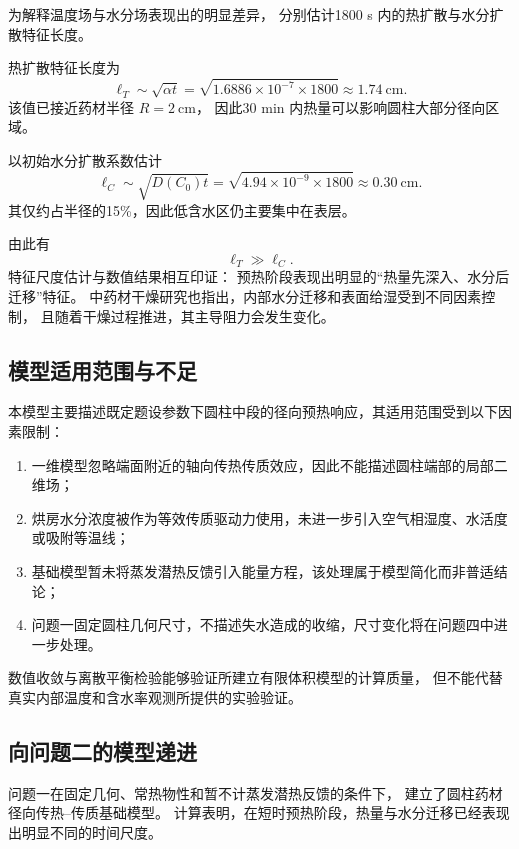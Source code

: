 \documentclass[UTF8,a4paper,12pt]{ctexart}
\begin{document}
为解释温度场与水分场表现出的明显差异，
分别估计1800 s 内的热扩散与水分扩散特征长度。

热扩散特征长度为
\begin{equation}
\ell_T\sim\sqrt{\alpha t}
=
\sqrt{
1.6886\times10^{-7}\times1800
}
\approx1.74\ \mathrm{cm}.
\end{equation}
该值已接近药材半径 $R=2~\mathrm{cm}$，
因此30 min 内热量可以影响圆柱大部分径向区域。

以初始水分扩散系数估计
\begin{equation}
\ell_C
\sim
\sqrt{D(C_0)t}
=
\sqrt{
4.94\times10^{-9}\times1800
}
\approx0.30\ \mathrm{cm}.
\end{equation}
其仅约占半径的15\%，因此低含水区仍主要集中在表层。

由此有
\begin{equation}
\ell_T\gg\ell_C.
\end{equation}
特征尺度估计与数值结果相互印证：
预热阶段表现出明显的“热量先深入、水分后迁移”特征。
中药材干燥研究也指出，内部水分迁移和表面给湿受到不同因素控制，
且随着干燥过程推进，其主导阻力会发生变化\cite{wang2024}。

\subsection{模型适用范围与不足}

本模型主要描述既定题设参数下圆柱中段的径向预热响应，其适用范围受到以下因素限制：

\begin{enumerate}
    \item 一维模型忽略端面附近的轴向传热传质效应，因此不能描述圆柱端部的局部二维场；
    \item 烘房水分浓度被作为等效传质驱动力使用，未进一步引入空气相湿度、水活度或吸附等温线；
    \item 基础模型暂未将蒸发潜热反馈引入能量方程，该处理属于模型简化而非普适结论；
    \item 问题一固定圆柱几何尺寸，不描述失水造成的收缩，尺寸变化将在问题四中进一步处理。
\end{enumerate}

数值收敛与离散平衡检验能够验证所建立有限体积模型的计算质量，
但不能代替真实内部温度和含水率观测所提供的实验验证。

\subsection{向问题二的模型递进}

问题一在固定几何、常热物性和暂不计蒸发潜热反馈的条件下，
建立了圆柱药材径向传热--传质基础模型。
计算表明，在短时预热阶段，热量与水分迁移已经表现出明显不同的时间尺度。
\end{document}
